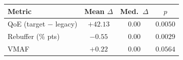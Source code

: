\begin{tabular}{@{}lccc@{}}
\toprule
\textbf{Metric} & \textbf{Mean $\Delta$} & \textbf{Med.\ $\Delta$} & \textbf{$p$} \\
\midrule
QoE (target $-$ legacy) & $+42.13$ & $0.00$ & $0.0050$ \\
Rebuffer (\% pts)         & $-0.55$  & $0.00$ & $0.0029$ \\
VMAF                      & $+0.22$  & $0.00$ & $0.0564$ \\
\bottomrule
\end{tabular}
